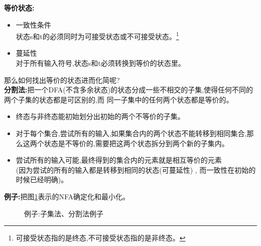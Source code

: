   \spaceline
  \textbf{等价状态:}
  \begin{itemize}
    \item [(1)] 一致性条件\\
    状态s和t的必须同时为可接受状态或不可接受状态。\footnote{可接受状态指的是终态,不可接受状态指的是非终态。}
    \item [(2)] 蔓延性\\
    对于所有输入符号,状态s和t必须转换到等价的状态里。
  \end{itemize}

  \spaceline
  那么如何找出等价的状态进而化简呢?\\
  \textbf{分割法:}把一个DFA(不含多余状态)的状态分成一些不相交的子集,使得任何不同的两个子集的状态都是可区别的,而
  同一子集中的任何两个状态都是等价的。

  \begin{itemize}
    \item 终态与非终态能初始划分出初始的两个不等价的子集。
    \item 对于每个集合,尝试所有的输入,如果集合内的两个状态不能转移到相同集合,那么这两个状态是不等价的,需要把这两个状态拆分到两个新的子集内。
    \item 尝试所有的输入可能,最终得到的集合内的元素就是相互等价的元素\\
    (因为尝试的所有的输入都是转移到相同的状态(可蔓延性) , 而一致性在初始的时候已经明确)。
  \end{itemize}

  \spaceline
  \textbf{例子:}把图\ref{example-zijifafengefa}表示的NFA确定化和最小化。
  \begin{figure}[H]
    \centering
    \caption{例子:子集法、分割法例子}
    \label{example-zijifafengefa}
  \end{figure}

